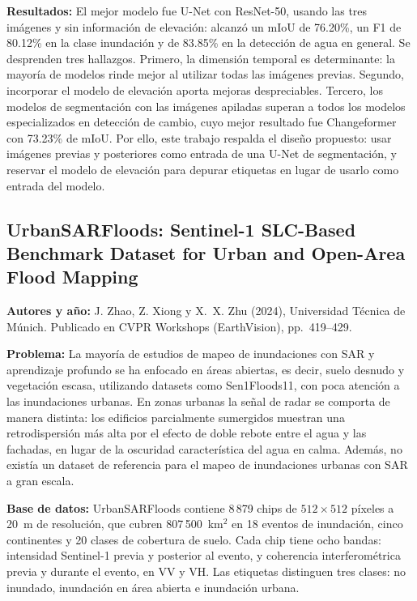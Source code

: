 \documentclass[conference]{IEEEtran}
\begin{document}
\textbf{Resultados:} El mejor modelo fue U-Net con ResNet-50, usando las tres imágenes y sin información de elevación: alcanzó un mIoU de 76.20\%, un F1 de 80.12\% en la clase inundación y de 83.85\% en la detección de agua en general. Se desprenden tres hallazgos. Primero, la dimensión temporal es determinante: la mayoría de modelos rinde mejor al utilizar todas las imágenes previas. Segundo, incorporar el modelo de elevación aporta mejoras despreciables. Tercero, los modelos de segmentación con las imágenes apiladas superan a todos los modelos especializados en detección de cambio, cuyo mejor resultado fue Changeformer con 73.23\% de mIoU. Por ello, este trabajo respalda el diseño propuesto: usar imágenes previas y posteriores como entrada de una U-Net de segmentación, y reservar el modelo de elevación para depurar etiquetas en lugar de usarlo como entrada del modelo.

\subsection{UrbanSARFloods: Sentinel-1 SLC-Based Benchmark Dataset for Urban and Open-Area Flood Mapping \cite{zhao2024urbansarfloods}}

\textbf{Autores y año:} J. Zhao, Z. Xiong y X.~X. Zhu (2024), Universidad Técnica de Múnich. Publicado en CVPR Workshops (EarthVision), pp.~419--429.

\textbf{Problema:} La mayoría de estudios de mapeo de inundaciones con SAR y aprendizaje profundo se ha enfocado en áreas abiertas, es decir, suelo desnudo y vegetación escasa, utilizando datasets como Sen1Floods11, con poca atención a las inundaciones urbanas. En zonas urbanas la señal de radar se comporta de manera distinta: los edificios parcialmente sumergidos muestran una retrodispersión más alta por el efecto de doble rebote entre el agua y las fachadas, en lugar de la oscuridad característica del agua en calma. Además, no existía un dataset de referencia para el mapeo de inundaciones urbanas con SAR a gran escala.

\textbf{Base de datos:} UrbanSARFloods contiene 8\,879 chips de $512\times512$ píxeles a 20~m de resolución, que cubren 807\,500~km$^2$ en 18 eventos de inundación, cinco continentes y 20 clases de cobertura de suelo. Cada chip tiene ocho bandas: intensidad Sentinel-1 previa y posterior al evento, y coherencia interferométrica previa y durante el evento, en VV y VH. Las etiquetas distinguen tres clases: no inundado, inundación en área abierta e inundación urbana.
\end{document}
